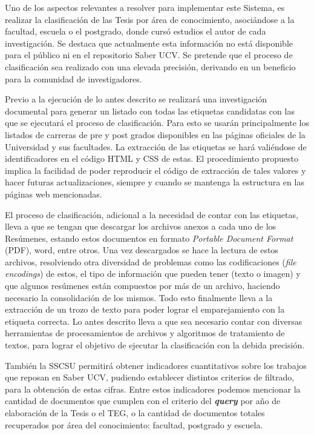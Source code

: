 \documentclass[
  10,
  spanish,
  openany]{book}
\begin{document}
Uno de los aspectos relevantes a resolver para implementar este Sistema, es realizar la clasificación de las Tesis por área de conocimiento, asociándose a la facultad, escuela o el postgrado, donde cursó estudios el autor de cada investigación. Se destaca que actualmente esta información no está disponible para el público ni en el repositorio Saber UCV. Se pretende que el proceso de clasificación sea realizado con una elevada precisión, derivando en un beneficio para la comunidad de investigadores.

Previo a la ejecución de lo antes descrito se realizará una investigación documental para generar un listado con todas las etiquetas candidatas con las que se ejecutará el proceso de clasificación. Para esto se usarán principalmente los listados de carreras de pre y post grados disponibles en las páginas oficiales de la Universidad y sus facultades. La extracción de las etiquetas se hará valiéndose de identificadores en el código HTML y CSS de estas. El procedimiento propuesto implica la facilidad de poder reproducir el código de extracción de tales valores y hacer futuras actualizaciones, siempre y cuando se mantenga la estructura en las páginas web mencionadas.

El proceso de clasificación, adicional a la necesidad de contar con las etiquetas, lleva a que se tengan que descargar los archivos anexos a cada uno de los Resúmenes, estando estos documentos en formato \emph{Portable Document Format} (PDF), word, entre otros. Una vez descargados se hace la lectura de estos archivos, resolviendo otra diversidad de problemas como las codificaciones (\emph{file encodings}) de estos, el tipo de información que pueden tener (texto o imagen) y que algunos resúmenes están compuestos por más de un archivo, haciendo necesario la consolidación de los mismos. Todo esto finalmente lleva a la extracción de un trozo de texto para poder lograr el emparejamiento con la etiqueta correcta. Lo antes descrito lleva a que sea necesario contar con diversas herramientas de procesamientos de archivos y algoritmos de tratamiento de textos, para lograr el objetivo de ejecutar la clasificación con la debida precisión.

También la SSCSU permitirá obtener indicadores cuantitativos sobre los trabajos que reposan en Saber UCV, pudiendo establecer distintos criterios de filtrado, para la obtención de estas cifras. Entre estos indicadores podemos mencionar la cantidad de documentos que cumplen con el criterio del \textbf{\emph{query}} por año de elaboración de la Tesis o el TEG, o la cantidad de documentos totales recuperados por área del conocimiento: facultad, postgrado y escuela.
\end{document}
